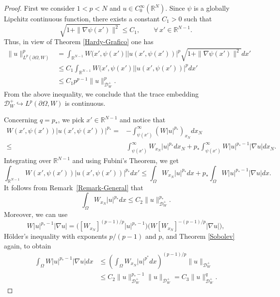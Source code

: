 \documentclass[12pt]{amsart}
\theoremstyle{definition}
\theoremstyle{plain}
\newcommand{\dint}{\int_{\Omega}}
\begin{document}
 \begin{proof}
		First we consider $1<p<N$ and $u\in C_0^\infty(\mathbb{R}^N)$. 
        Since $\psi$ is a globally Lipchitz continuous function, there exists 
        a constant $C_1>0$ such that 
        $$
        \sqrt{1+\|\nabla \psi(x')\|^2 } \leq C_1,\qquad \forall \,x'\in \mathbb{R}^{N-1}.
        $$
        Thus, in view of Theorem \ref{Hardy-Grafico} one has
        \begin{equation} \label{JP-1}
                \begin{aligned}
    	\|u\|_{L^p(\partial\Omega,W)}^p & =  \int_{\mathbb{R}^{N-1}} W(x',\psi(x')||u(x',\psi(x'))|^p \sqrt{1+\|\nabla \psi(x')\|^2 }dx' \\& \leq C_1 \int_{\mathbb{R}^{N-1}} W(x',\psi(x')||u(x',\psi(x'))|^p dx'  \\& \leq C_1 p^{p-1}\|u\|_{\mathcal{D}_W^+}^p.
    \end{aligned}
    \end{equation}
        From the above inequality, we conclude that  the trace embedding $\mathcal{D}_W^+ \hookrightarrow L^p(\partial\Omega,W)$ is continuous.
        
        Concerning $q=p_*$, we pick $x' \in \mathbb{R}^{N-1}$ and notice that
        \begin{align*}       W(x',\psi(x'))|u(x',\psi(x'))|^{p_*}=&-\int_{\psi(x')}^{\infty}\left(W|u|^{p_*}\right)_{x_N}dx_N\\		\leq&\int_{\psi(x')}^{\infty}W_{x_N}|u|^{p_*}dx_N+p_*\int_{\psi(x')}^{\infty}W|u|^{p_*-1}|\nabla u|dx_N.
		\end{align*}
		Integrating over $\mathbb{R}^{N-1}$ and using Fubini's Theorem, we get 
		\begin{equation} \label{JP-dez}
		\int_{\mathbb{R}^{N-1}}W(x',\psi(x'))|u(x',\psi(x'))|^{p_*}dx'\leq \dint W_{x_N}|u|^{p_*}dx + p_*\dint W|u|^{p_*-1}|\nabla u|dx.
		\end{equation}
		It follows from   Remark~\ref{Remark-General} that   
		\begin{equation*}		\dint W_{x_N}|u|^{p_*}dx\leq C_2\|u\|^{p_*}_{\mathcal{D}_W^+}.
		\end{equation*}
        Moreover, we can use 
        $$
        W|u|^{p_*-1}|\nabla u|= \Big( [W_{x_N}]^{(p-1)/p}|u|^{p_*-1} \Big) \Big( W [W_{x_N}]^{{-(p-1)/p}} |\nabla u|\Big),
        $$
        Hölder's inequality with exponents $p/(p-1)$ and $p$,  and Theorem \ref{Sobolev} again, to obtain
        \begin{align*}
			\dint W|u|^{p_*-1}|\nabla u|dx & \leq  \left(\dint W_{x_N}|u|^{p^*}dx\right)^{(p-1)/p} \|u\|_{\mathcal{D}_W^+} \\
            & \leq C_2 \|u\|_{\mathcal{D}_W^+}^{p_*-1} \|u\|_{\mathcal{D}_W^+} = C_3 \|u\|_{\mathcal{D}_W^+}^q.
		\end{align*}


\end{proof}
\end{document}
